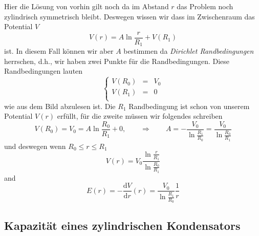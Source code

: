 \documentclass[A4paper, 12pt]{amsart}
\begin{document}
Hier die Lösung von vorhin gilt noch da im Abstand
$ r $ das Problem noch zylindrisch symmetrisch bleibt.
Deswegen wissen wir dass im Zwischenraum das Potential $ V $
\begin{equation}
  V(r) =
  A \ln \frac{r}{R_{1}}
  +
  V(R_{1})
\end{equation}
ist.
In diesem Fall können wir aber $ A $ bestimmen da
\textit{Dirichlet Randbedingungen}
herrschen, d.h., wir haben zwei Punkte für die Randbedingungen.
Diese Randbedingungen lauten
%
\begin{equation*}
  \left\{
    \begin{matrix}
      V(R_{0}) & = & V_{0} \\
      V(R_{1}) & = & 0 \\
    \end{matrix}
  \right.
\end{equation*}
%
wie aus dem Bild abzulesen ist.
Die $ R_{1} $ Randbedingung ist schon von unserem Potential $ V(r) $ erfüllt,
für die zweite müssen wir folgendes schreiben
%
\begin{equation*}
  V(R_{0}) = V_{0} =
  A \ln \frac{R_{0}}{R_{1}}
  +
  0,
  \qquad \Rightarrow \qquad
  A =
  -
  \frac{V_{0}}{\ln \frac{R_{1}}{R_{0}}}
  =
  \frac{V_{0}}{\ln \frac{R_{0}}{R_{1}}}
\end{equation*}
%
und deswegen wenn $ R_{0} \leq r \leq R_{1} $
\begin{equation*}
  V(r) =
  V_{0}
  \frac{\ln \frac{r}{R_{1}}}{\ln \frac{R_{0}}{R_{1}}}
\end{equation*}
and
\begin{equation*}
  E(r) =
  - \frac{\mathrm{d}V}{\mathrm{d}r}(r)
  =
  \frac{V_{0}}{\ln \frac{R_{1}}{R_{0}}}
  \frac{1}{r}
\end{equation*}

\subsection{Kapazität eines zylindrischen Kondensators}
\end{document}
